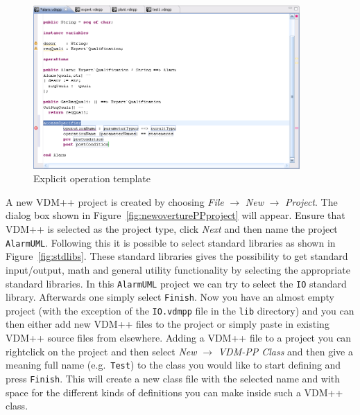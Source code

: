 \begin{figure}
	\begin{center}
	\includegraphics[width=4in]{figures/OperationTemplate}
	\caption{Explicit operation template}
	\label{fig:operationTemplate}
	\end{center}
\end{figure}

A new VDM++ project is created by choosing \emph{File} $ \rightarrow$
\emph{New} $\rightarrow$ \emph{Project}. The dialog box shown in
Figure~\ref{fig:newoverturePPproject} will appear. Ensure that VDM++
is selected as the project type, click \emph{Next} and then name the
project \texttt{AlarmUML}. Following this it is possible
to select standard libraries as shown in
Figure~\ref{fig:stdlibs}. These standard libraries gives the possibility to get standard
input/output, math and general utility functionality by selecting the
appropriate standard libraries. In this \texttt{AlarmUML} project we can
try to select the \texttt{IO} standard library. Afterwards one simply
select \texttt{Finish}. Now you have an almost empty project (with the
exception of the \texttt{IO.vdmpp} file in the \texttt{lib} directory)
and you can then either add new VDM++ files to the project or simply paste in existing
VDM++ source files from elsewhere. Adding a VDM++ file to a project
you can rightclick on the project and then select \emph{New}
$\rightarrow$ \emph{VDM-PP Class} and then give a meaning full name
(e.g.\ \texttt{Test}) to the class you would like to start defining and press
\texttt{Finish}. This will create a new class file with the
selected name and with space for the different kinds of definitions
you can make inside such a VDM++ class.

